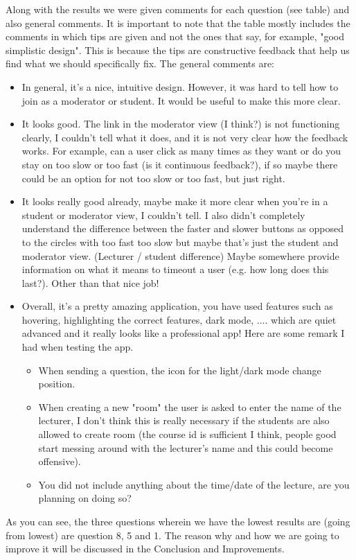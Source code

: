 \documentclass{article}
\begin{document}
Along with the results we were given comments for each question (see table) and also general comments.
It is important to note that the table mostly includes the comments in which tips are given and not the ones that say, for example, "good simplistic design".
This is because the tips are constructive feedback that help us find what we should specifically fix.
The general comments are:
\begin{itemize}
    \item In general, it's a nice, intuitive design. However, it was hard to tell how to join as a moderator or student. It would be useful to make this more clear.
    \item It looks good. The link in the moderator view (I think?) is not functioning clearly, I couldn't tell what it does, and it is not very clear how the feedback works. For example, can a user click as many times as they want or do you stay on too slow or too fast (is it continuous feedback?), if so maybe there could be an option for not too slow or too fast, but just right.
    \item It looks really good already, maybe make it more clear when you're in a student or moderator view, I couldn't tell. I also didn't completely understand the difference between the faster and slower buttons as opposed to the circles with too fast too slow but maybe that's just the student and moderator view. (Lecturer / student difference) Maybe somewhere provide information on what it means to timeout a user (e.g. how long does this last?). Other than that nice job!
    \item Overall, it's a pretty amazing application, you have used features such as hovering, highlighting the correct features, dark mode, .... which are quiet advanced and it really looks like a professional app! Here are some remark I had when testing the app.
    \begin{itemize}
        \item When sending a question, the icon for the light/dark mode change position.
        \item When creating a new "room" the user is asked to enter the name of the lecturer, I don't think this is really necessary if the students are also allowed to create room (the course id is sufficient I think, people good start messing around with the lecturer's name and this could become offensive).
        \item You did not include anything about the time/date of the lecture, are you planning on doing so?
    \end{itemize}
\end{itemize}
As you can see, the three questions wherein we have the lowest results are (going from lowest) are question 8, 5 and 1.
The reason why and how we are going to improve it will be discussed in the Conclusion and Improvements.
\end{document}
